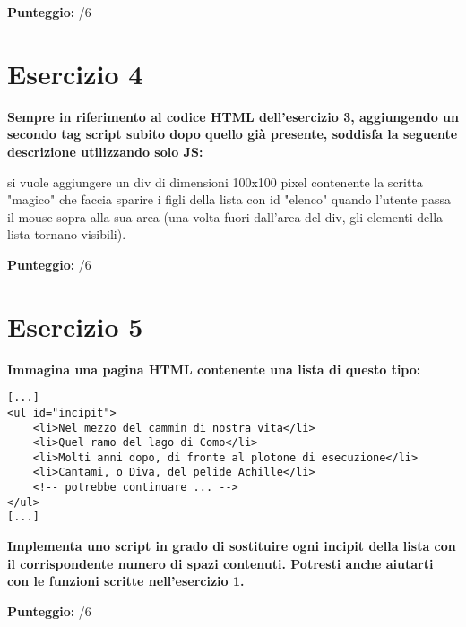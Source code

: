 \documentclass{article}
\begin{document}
\begin{flushright}\textbf{Punteggio:} \underline{\hspace{1cm}}/6\end{flushright}

\section*{Esercizio 4}

\textbf{Sempre in riferimento al codice HTML dell'esercizio 3, aggiungendo un secondo tag script subito dopo quello già presente, soddisfa la seguente descrizione utilizzando solo JS:}

\bigbreak

si vuole aggiungere un div di dimensioni 100x100 pixel contenente la scritta "magico" che faccia sparire i figli della lista con id "elenco" quando l'utente passa il mouse sopra alla sua area (una volta fuori dall'area del div, gli elementi della lista tornano visibili).

\begin{flushright}\textbf{Punteggio:} \underline{\hspace{1cm}}/6\end{flushright}

\section*{Esercizio 5}

\textbf{Immagina una pagina HTML contenente una lista di questo tipo:}

\begin{lstlisting}
[...]
<ul id="incipit">
    <li>Nel mezzo del cammin di nostra vita</li>
    <li>Quel ramo del lago di Como</li>
    <li>Molti anni dopo, di fronte al plotone di esecuzione</li>
    <li>Cantami, o Diva, del pelide Achille</li>
    <!-- potrebbe continuare ... -->
</ul>
[...]
\end{lstlisting}

\textbf{Implementa uno script in grado di sostituire ogni incipit della lista con il corrispondente numero di spazi contenuti. Potresti anche aiutarti con le funzioni scritte nell'esercizio 1.}

\begin{flushright}\textbf{Punteggio:} \underline{\hspace{1cm}}/6\end{flushright}



\end{document}
